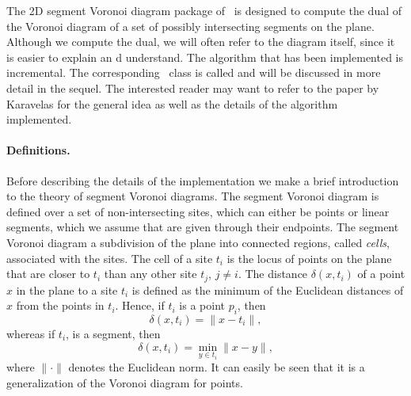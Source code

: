 The 2D segment Voronoi diagram package of \cgal\ is designed to
compute the dual of the Voronoi diagram of a set of possibly
intersecting segments on the plane. Although we compute the dual, we
will often refer to the diagram itself, since it is easier to
explain an d understand. The algorithm that has been
implemented is incremental. The corresponding \cgal\ class is called
and will be discussed in more detail in the sequel. The interested
reader may want to refer to the paper by Karavelas
\cite{cgal:k-reisv-04} for the general idea as well as the details of
the algorithm implemented.

\paragraph{Definitions.}
Before describing the details of the implementation we make a brief
introduction to the theory of segment Voronoi diagrams.
The segment Voronoi diagram is defined over a set of non-intersecting
sites, which can either be points or linear segments, which we assume
that are given through their endpoints. The segment Voronoi diagram a
subdivision of the plane into connected regions, called {\em cells},
associated with the sites. The cell of a site $t_i$ is the locus of
points on the plane that are closer to $t_i$ than any other site
$t_j$, $j\neq i$.
The distance $\delta(x, t_i)$ of a point $x$ in the plane to a 
site $t_i$ is defined as the minimum of the Euclidean distances of $x$
from the points in $t_i$. Hence, if $t_i$ is a point $p_i$, then
\[      \delta(x,t_i)=\|x-t_i\|,  \]
whereas if $t_i$, is a segment, then
\[      \delta(x,t_i)=\min_{y\in t_i}\|x-y\|, \]
where $\|\cdot\|$ denotes the Euclidean norm.
It can easily be seen that it is a generalization of the Voronoi
diagram for points.

